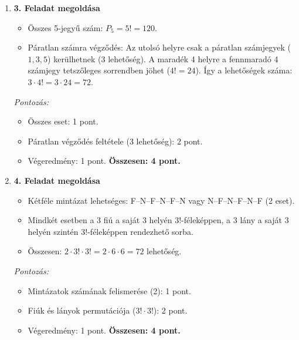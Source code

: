 \documentclass[12pt,a4paper]{article}
\begin{document}
\begin{enumerate}
    \item \textbf{3. Feladat megoldása}
    \begin{itemize}
        \item Összes 5-jegyű szám: $P_5 = 5! = 120$.
        \item Páratlan számra végződés: Az utolsó helyre csak a páratlan számjegyek ($1, 3, 5$) kerülhetnek (3 lehetőség). A maradék 4 helyre a fennmaradó 4 számjegy tetszőleges sorrendben jöhet ($4! = 24$). Így a lehetőségek száma: $3 \cdot 4! = 3 \cdot 24 = 72$.
    \end{itemize}
    \emph{Pontozás:}
    \begin{itemize}
        \item Összes eset: 1 pont.
        \item Páratlan végződés feltétele (3 lehetőség): 2 pont.
        \item Végeredmény: 1 pont.
        \textbf{Összesen: 4 pont.}
    \end{itemize}

    \vspace{0.3cm}

    \item \textbf{4. Feladat megoldása}
    \begin{itemize}
        \item Kétféle mintázat lehetséges: F--N--F--N--F--N vagy N--F--N--F--N--F (2 eset).
        \item Mindkét esetben a 3 fiú a saját 3 helyén $3!$-féleképpen, a 3 lány a saját 3 helyén szintén $3!$-féleképpen rendezhető sorba.
        \item Összesen: $2 \cdot 3! \cdot 3! = 2 \cdot 6 \cdot 6 = 72$ lehetőség.
    \end{itemize}
    \emph{Pontozás:}
    \begin{itemize}
        \item Mintázatok számának felismerése (2): 1 pont.
        \item Fiúk és lányok permutációja ($3! \cdot 3!$): 2 pont.
        \item Végeredmény: 1 pont.
        \textbf{Összesen: 4 pont.}
    \end{itemize}

    \vspace{0.3cm}


\end{enumerate}
\end{document}
